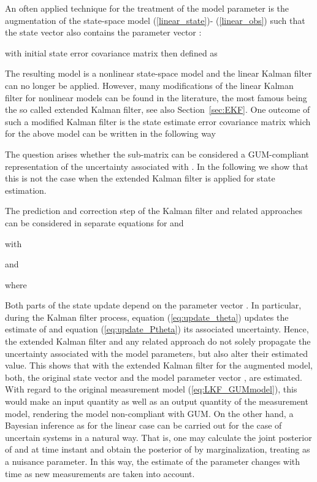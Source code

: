 \documentclass[10pt]{article}
\begin{document}
\begin{spacing}{1}
An often applied technique for the treatment of the model parameter  is the augmentation of the state-space model (\ref{linear_state})- (\ref{linear_obs}) such that the state vector also contains the parameter vector :

with initial state error covariance matrix then defined as

The resulting model is a nonlinear state-space model and the linear Kalman filter can no longer be applied. However, many modifications of the linear Kalman filter for nonlinear models can be found in the literature, the most famous being the so called extended Kalman filter, see also Section~\ref{sec:EKF}. One outcome of such a modified Kalman filter is the state estimate error covariance matrix  which for the above model can be written in the following way

The question arises whether the sub-matrix  can be considered a GUM-compliant representation of the uncertainty associated with . In the following we show that this is not the case when the extended Kalman filter is applied for state estimation.

The prediction and correction step of the Kalman filter and related approaches can be considered in separate equations for  and ~\cite{Ljung:1979vz}
 
with


and


where 


Both parts of the state update depend on the parameter vector . In particular, during the Kalman filter process, equation (\ref{eq:update_theta}) updates the estimate of  and equation (\ref{eq:update_Ptheta}) its associated uncertainty. Hence, the extended Kalman filter and any related approach do not solely propagate the uncertainty associated with the model parameters, but also alter their estimated value. This shows that with the extended Kalman filter for the augmented model, both, the original state vector  and the model parameter vector , are estimated. With regard to the original measurement model (\ref{eq:LKF_GUMmodel}), this would make  an input quantity as well as an output quantity of the measurement model, rendering the model non-compliant with GUM. On the other hand, a Bayesian inference as for the linear case can be carried out for the case of uncertain systems in a natural way. That is, one may calculate the joint posterior of  and  at time instant  and obtain the posterior of  by marginalization, treating  as a nuisance parameter. In this way, the estimate of the parameter  changes with time as new measurements  are taken into account.


\end{spacing}
\end{document}
